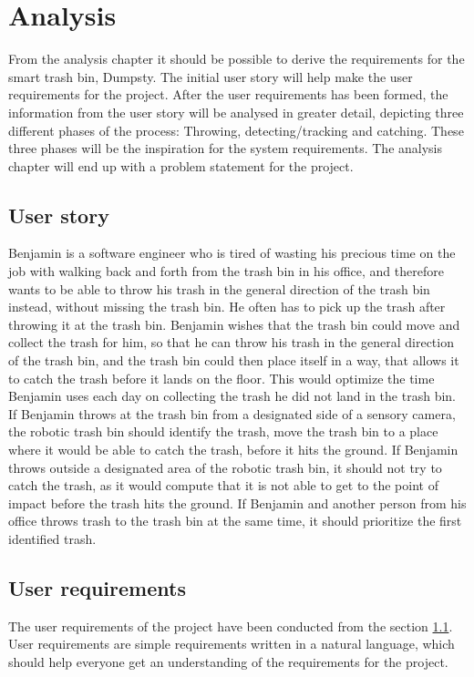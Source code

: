 \chapter{Analysis}
\label{chap:Analysis}
From the analysis chapter it should be possible to derive the requirements for the smart trash bin, Dumpsty. The initial user story will help make the user requirements for the project. After the user requirements has been formed, the information from the user story will be analysed in greater detail, depicting three different phases of the process: Throwing, detecting/tracking and catching. These three phases will be the inspiration for the system requirements. 
The analysis chapter will end up with a problem statement for the project. 

\section{User story}
\label{sec:User story}
Benjamin is a software engineer who is tired of wasting his precious time on the job with walking back and forth from the trash bin in his office, and therefore wants to be able to throw his trash in the general direction of the trash bin instead, without missing the trash bin. He often has to pick up the trash after throwing it at the trash bin. \newline
Benjamin wishes that the trash bin could move and collect the trash for him, so that he can throw his trash in the general direction of the trash bin, and the trash bin could then place itself in a way, that allows it to catch the trash before it lands on the floor. This would optimize the time Benjamin uses each day on collecting the trash he did not land in the trash bin.\newline
If Benjamin throws at the trash bin from a designated side of a sensory camera, the robotic trash bin should identify the trash, move the trash bin to a place where it would be able to catch the trash, before it hits the ground.\newline
If Benjamin throws outside a designated area of the robotic trash bin, it should not try to catch the trash, as it would compute that it is not able to get to the point of impact before the trash hits the ground.\newline
If Benjamin and another person from his office throws trash to the trash bin at the same time, it should prioritize the first identified trash.

\section{User requirements}
\label{sec:User requirements}
The user requirements of the project have been conducted from the section \ref{sec:User story}. User requirements are simple requirements written in a natural language, which should help everyone get an understanding of the requirements for the project.

